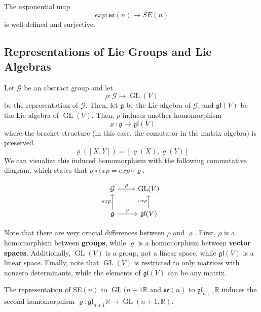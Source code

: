 \documentclass{article}
\DeclareMathOperator{\GL}{GL}
\begin{document}
      \begin{theorem}
        The exponential map
        \begin{equation}
          exp: \mathfrak{se}(n) \longrightarrow SE(n)
        \end{equation}
        is well-defined and surjective. 
      \end{theorem}

  \subsection{Representations of Lie Groups and Lie Algebras}

    Let $\mathcal{G}$ be an abstract group and let
    \begin{equation}
      \rho: \mathcal{G} \longrightarrow \GL(V)
    \end{equation}
    be the representation of $\mathcal{G}$. Then, let $\mathfrak{g}$ be the Lie algebra of $\mathcal{G}$, and $\mathfrak{gl}(V)$ be the Lie algebra of $\GL(V)$. Then, $\rho$ induces another homomorphism 
    \begin{equation}
      \varrho: \mathfrak{g} \longrightarrow \mathfrak{gl}(V)
    \end{equation}
    where the bracket structure (in this case, the comutator in the matrix algebra) is preserved. 
    \begin{equation}
      \varrho([X,Y]) = [\varrho(X), \varrho(Y)]
    \end{equation}
    We can visualize this induced homomorphism with the following commutative diagram, which states that $\rho \circ exp = exp \circ \varrho$. 

    \[\begin{tikzcd}
    \mathcal{G} \arrow{r}{\rho} & \GL(V)\\
    \mathfrak{g} \arrow{u}{exp} \arrow{r}{\varrho} & \mathfrak{gl}(V) \arrow{u}{exp}
    \end{tikzcd}\]

    Note that there are very crucial differences between $\rho$ and $\varrho$. First, $\rho$ is a homomorphism between \textbf{groups}, while $\varrho$ is a homomorphism between \textbf{vector spaces}. Additionally, $\GL(V)$ is a group, not a linear space, while $\mathfrak{gl}(V)$ is a linear space. Finally, note that $\GL(V)$ is restricted to only matrices with nonzero determinants, while the elements of $\mathfrak{gl}(V)$ can be any matrix. 

    \begin{example}
      The representation of SE$(n)$ to $\GL(n+1 \mathbb{R}$ and $\mathfrak{se}(n)$ to $\mathfrak{gl}_{n+1} \mathbb{R}$ induces the second homomorphism $\varrho: \mathfrak{gl}_{n+1} \mathbb{R} \longrightarrow \GL(n+1, \mathbb{R})$. 
    \end{example}
\end{document}
